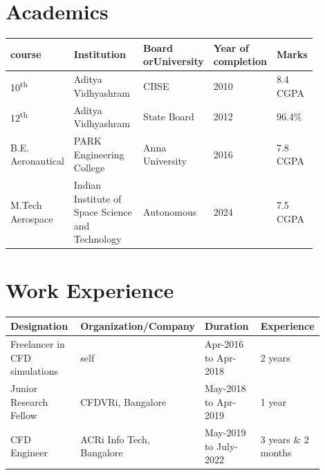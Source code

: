 \section{Academics}

\begin{table}[!h]
	\begin{tabular}{p{0.15\linewidth}p{0.25\linewidth}p{0.17\linewidth}p{0.18\linewidth}p{0.13\linewidth}}
		\toprule
		\textbf{course} & \textbf{Institution} & \textbf{Board or\newline University} & \textbf{Year of \newline completion} & \textbf{Marks} \\[0.2cm] \midrule
		10\textsuperscript{th} & Aditya Vidhyashram & CBSE & 2010 & 8.4 CGPA \\[0.1cm]
		12\textsuperscript{th} & Aditya Vidhyashram & State Board & 2012 & 96.4\%  \\[0.1cm]
		B.E. \newline Aeronautical & PARK Engineering College & Anna University & 2016 & 7.8 CGPA  \\[0.2cm]
		M.Tech \newline Aerospace & Indian Institute of Space Science and Technology & Autonomous & 2024 & 7.5 CGPA \\ \bottomrule
	\end{tabular}
\end{table}


\section{Work Experience}

\begin{table}[!h]
	\begin{tabular}{p{0.25\linewidth}p{0.27\linewidth}p{0.205\linewidth}p{0.18\linewidth}}
		\toprule
		\textbf{Designation} & \textbf{Organization/Company} & \textbf{Duration} & \textbf{Experience} \\ \midrule
		Freelancer in CFD \newline simulations & self & Apr-2016 to Apr-2018 & 2 years \\[0.2cm]
		Junior Research Fellow & CFDVRi, Bangalore & May-2018 to Apr-2019 & 1 year \\[0.2cm]
		CFD Engineer & ACRi Info Tech, Bangalore & May-2019 to July-2022 & 3 years \& 2 months \\ \bottomrule
	\end{tabular}
\end{table}

